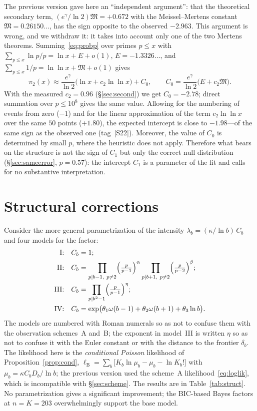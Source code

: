 \documentclass[11pt,a4paper]{article}
\theoremstyle{plain}
\theoremstyle{remark}
\newcommand{\eg}{e^{\gamma}}
\begin{document}
The previous version gave here an ``independent argument'': that the theoretical
secondary term, $(\eg/\ln2)\mathfrak M=+0.672$ with the Meissel--Mertens constant
$\mathfrak M=0.26150\ldots$, has the sign opposite to the observed $-2.963$. This
argument is wrong, and we withdraw it: it takes into account only one of the two
Mertens theorems. Summing~\eqref{eq:probp} over primes $p\le x$ with
$\sum_{p\le x}\ln p/p=\ln x+E+o(1)$, $E=-1.3326\ldots$, and
$\sum_{p\le x}1/p=\ln\ln x+\mathfrak M+o(1)$ gives
\[
\pi_2(x)\approx\frac{\eg}{\ln2}\bigl(\ln x+c_2\ln\ln x\bigr)+C_0,\qquad
C_0=\frac{\eg}{\ln2}\bigl(E+c_2\mathfrak M\bigr).
\]
With the measured $c_2=0.96$ (\S\ref{sec:second}) we get $C_0=-2.78$; direct
summation over $p\le10^8$ gives the same value. Allowing for the numbering of
events from zero ($-1$) and for the linear approximation of the term
$c_2\ln\ln x$ over the same $50$ points ($+1.80$), the expected intercept is
close to $-1.98$---of the same sign as the observed one (tag~[S22]). Moreover,
the value of $C_0$ is determined by small $p$, where the heuristic does not
apply. Therefore what bears on the structure is not the sign of $C_1$ but only
the correct null distribution (\S\ref{sec:sameerror}, $p=0.57$): the intercept
$C_1$ is a parameter of the fit and calls for no substantive interpretation.

\section{Structural corrections}\label{sec:struct}

Consider the more general parametrization of the intensity
$\lambda_b=(\kappa/\ln b)\,C_b$ and four models for the factor:
\begin{align*}
\text{I:}&\quad C_b=1;\\
\text{II:}&\quad C_b=\prod_{p\mid b-1,\ p\ne2}\Bigl(\tfrac{p}{p-1}\Bigr)^{\alpha}
                 \prod_{p\mid b+1,\ p\ne2}\Bigl(\tfrac{p}{p-2}\Bigr)^{\beta};\\
\text{III:}&\quad C_b=\prod_{p\mid b^2-1}\Bigl(\tfrac{p}{p-1}\Bigr)^{\eta};\\
\text{IV:}&\quad C_b=\exp\bigl(\theta_1\omega(b-1)+\theta_2\omega(b+1)+\theta_3\ln b\bigr).
\end{align*}
The models are numbered with Roman numerals so as not to confuse them with the
observation schemes~A and~B; the exponent in model~III is written $\eta$ so as
not to confuse it with the Euler constant or with the distance to the frontier
$\delta_b$. The likelihood here is the \emph{conditional
Poisson} likelihood of Proposition~\ref{prop:cond},
$\ell_{\mathrm B}=\sum_b\bigl[K_b\ln\mu_b-\mu_b-\ln K_b!\bigr]$ with
$\mu_b=\kappa C_b D_b/\ln b$; the previous version used the scheme~A
likelihood~\eqref{eq:loglik}, which is incompatible with \S\ref{sec:scheme}. The
results are in Table~\ref{tab:struct}. No parametrization gives a significant
improvement; the BIC-based Bayes factors at $n=K=203$ overwhelmingly support the
base model.
\end{document}
